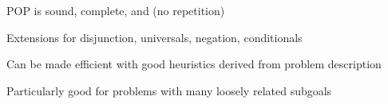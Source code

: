 \documentclass{article}
\begin{document}
\begin{huge}
POP is sound, complete, and  (no repetition)

Extensions for disjunction, universals, negation, conditionals

Can be made efficient with good heuristics derived from problem description

Particularly good for problems with many loosely related subgoals



\vspace*{0.3in}

\textwidth
{}


\vspace*{0.1in}

\textwidth
{}





\vspace*{0.1in}

\textwidth
{}




\vspace*{0.1in}

\textwidth
{}




\vspace*{0.1in}

\textwidth
{}




\end{huge} 
\end{document}
